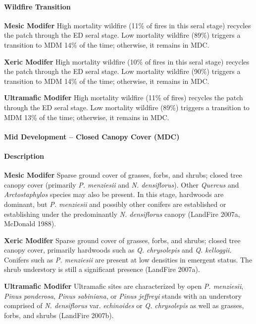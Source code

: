 \paragraph{Wildfire Transition}
\begin{adjustwidth}{2cm}{}
\textbf{Mesic Modifer } High mortality wildfire (11\% of fires in this seral stage) recycles the patch through the ED seral stage. Low mortality wildfire (89\%) triggers a transition to MDM 14\% of the time; otherwise, it remains in MDC.

\medskip
\noindent \textbf{Xeric Modifer} High mortality wildfire (10\% of fires in this seral stage) recycles the patch through the ED seral stage. Low mortality wildfire (90\%) triggers a transition to MDM 14\% of the time; otherwise, it remains in MDC.

\medskip
\noindent \textbf{Ultramafic Modifer} High mortality wildfire (11\% of fires) recycles the patch through the ED seral stage. Low mortality wildfire (89\%) triggers a transition to MDM 13\% of the time; otherwise, it remains in MDC.

\end{adjustwidth}
\noindent\hrulefill

\paragraph{Mid Development – Closed Canopy Cover (MDC)}

\paragraph{Description}
\begin{adjustwidth}{2cm}{}
\textbf{Mesic Modifer } Sparse ground cover of grasses, forbs, and shrubs; closed tree canopy cover (primarily \emph{P. menziesii} and \emph{N. densiflorus}). Other \emph{Quercus} and \emph{Arctostaphylos} species may also be present. In this stage, hardwoods are dominant, but \emph{P. menziesii} and possibly other conifers are established or establishing under the predominantly \emph{N. densiflorus} canopy (LandFire 2007a, McDonald 1988). 

\medskip
\noindent \textbf{Xeric Modifer} Sparse ground cover of grasses, forbs, and shrubs; closed tree canopy cover, primarily hardwoods such as \emph{Q. chrysolepis} and \emph{Q. kelloggii}. Conifers such as \emph{P. menziesii} are present at low densities in emergent status. The shrub understory is still a significant presence (LandFire 2007a). 

\medskip
\noindent \textbf{Ultramafic Modifer} Ultramafic sites are characterized by open \emph{P. menziesii}, \emph{Pinus ponderosa}, \emph{Pinus sabiniana}, or \emph{Pinus jeffreyi} stands with an understory comprised of \emph{N. densiflorus} var. \emph{echinoides} or \emph{Q. chrysolepis} as well as grasses, forbs, and shrubs (LandFire 2007b).

\end{adjustwidth}
